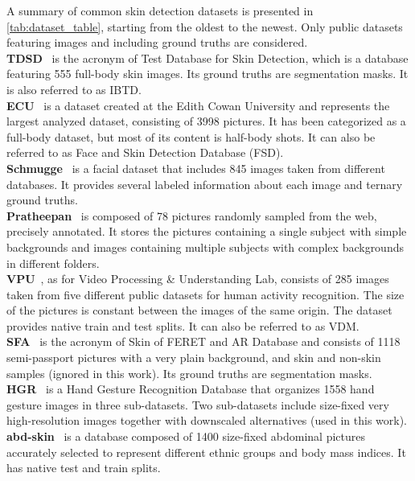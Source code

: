 A summary of common skin detection datasets is presented in \autoref{tab:dataset_table}, starting from the oldest to the newest. Only public datasets featuring images and including ground truths are considered.\\ 
\textbf{TDSD}~\cite{zhu2004adaptive} is the acronym of Test Database for Skin Detection, which is a database featuring 555 full-body skin images. Its ground truths are segmentation masks. It is also referred to as IBTD.\\
\textbf{ECU}~\cite{phung2005skin} is a dataset created at the Edith Cowan University and represents the largest analyzed dataset, consisting of 3998 pictures. It has been categorized as a full-body dataset, but most of its content is half-body shots. It can also be referred to as Face and Skin Detection Database (FSD).\\
\textbf{Schmugge}~\cite{schmugge2007objective} is a facial dataset that includes 845 images taken from different databases. It provides several labeled information about each image and ternary ground truths.\\
\textbf{Pratheepan}~\cite{tan2011fusion} is composed of 78 pictures randomly sampled from the web, precisely annotated\cite{osman2016improved}. It stores the pictures containing a single subject with simple backgrounds and images containing multiple subjects with complex backgrounds in different folders.\\
\textbf{VPU}~\cite{sanmiguel2013skin}, as for Video Processing \& Understanding Lab, consists of 285 images taken from five different public datasets for human activity recognition. The size of the pictures is constant between the images of the same origin. The dataset provides native train and test splits. It can also be referred to as VDM.\\
\textbf{SFA}~\cite{casati2013sfa} is the acronym of Skin of FERET and AR Database and consists of 1118 semi-passport pictures with a very plain background, and skin and non-skin samples (ignored in this work). Its ground truths are segmentation masks.\\
\textbf{HGR}~\cite{Kawulok2014EURASIP} is a Hand Gesture Recognition Database that organizes 1558 hand gesture images in three sub-datasets. Two sub-datasets include size-fixed very high-resolution images together with downscaled alternatives (used in this work).\\
\textbf{abd-skin}~\cite{topiwala2019adaptation} is a database composed of 1400 size-fixed abdominal pictures accurately selected to represent different ethnic groups and body mass indices. It has native test and train splits.\\

